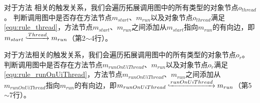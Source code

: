对于方法 相关的触发关系，我们会遍历拓展调用图中的所有类型的对象节点$o_{thread}$。
判断调用图中是否存在方法节点$m_{start} $、$m_{run} $以及对象节点$o_{thread}$满足\autoref{equ:rule_thread}，方法节点$m_{start} $、$m_{run} $之间添加从$m_{start} $指向$m_{run} $的有向边，即$m_{start} \lhook\joinrel\xrightarrow{Thread}  m_{run}  $（第2$\sim$4行）。


对于方法相关的触发关系，我们会遍历拓展调用图中的所有类型的对象节点$o_{r}$。
判断调用图中是否存在方法节点$m_{runOnUiThread} $、$m_{run} $以及对象节点$o_{r}$满足\autoref{equ:rule_runOnUiThread}，方法节点$m_{runOnUiThread} $、$m_{run} $之间添加从$m_{runOnUiThread} $指向$m_{run} $的有向边，即$m_{runOnUiThread} \lhook\joinrel\xrightarrow{runOnUiThread}  m_{run}  $（第5$\sim$7行）。













